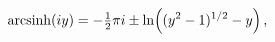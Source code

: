 \[\mathop{\mathrm{arcsinh}\/}\nolimits\!\left(iy\right)=-\tfrac{1}{2}\pi i\pm%
\mathop{\ln\/}\nolimits\!\left((y^{2}-1)^{1/2}-y\right),\]